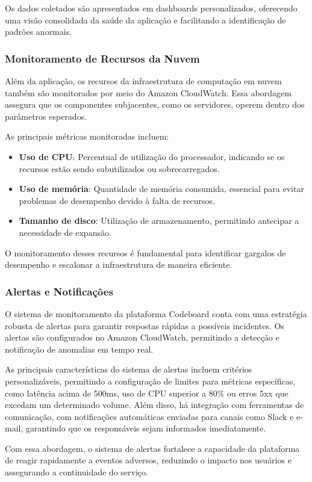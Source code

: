Os dados coletados são apresentados em dashboards personalizados, oferecendo uma visão consolidada da saúde da aplicação e facilitando a identificação de padrões anormais.


\subsubsection{Monitoramento de Recursos da Nuvem}


Além da aplicação, os recursos da infraestrutura de computação em nuvem também são monitorados por meio do Amazon CloudWatch. Essa abordagem assegura que os componentes subjacentes, como os servidores, operem dentro dos parâmetros esperados.

As principais métricas monitoradas incluem:

\begin{itemize}
    \item \textbf{Uso de CPU}: Percentual de utilização do processador, indicando se os recursos estão sendo subutilizados ou sobrecarregados.
    \item \textbf{Uso de memória}: Quantidade de memória consumida, essencial para evitar problemas de desempenho devido à falta de recursos.
    \item \textbf{Tamanho de disco}: Utilização de armazenamento, permitindo antecipar a necessidade de expansão.
\end{itemize}

O monitoramento desses recursos é fundamental para identificar gargalos de desempenho e escalonar a infraestrutura de maneira eficiente.

\subsubsection{Alertas e Notificações}

O sistema de monitoramento da plataforma Codeboard conta com uma estratégia robusta de alertas para garantir respostas rápidas a possíveis incidentes. Os alertas são configurados no Amazon CloudWatch, permitindo a detecção e notificação de anomalias em tempo real.

As principais características do sistema de alertas incluem critérios personalizáveis, permitindo a configuração de limites para métricas específicas, como latência acima de 500ms, uso de CPU superior a 80\% ou erros 5xx que excedam um determinado volume. Além disso, há integração com ferramentas de comunicação, com notificações automáticas enviadas para canais como Slack e e-mail, garantindo que os responsáveis sejam informados imediatamente.

Com essa abordagem, o sistema de alertas fortalece a capacidade da plataforma de reagir rapidamente a eventos adversos, reduzindo o impacto nos usuários e assegurando a continuidade do serviço.